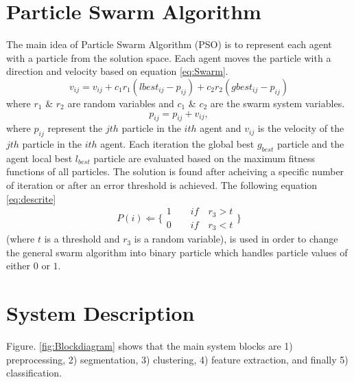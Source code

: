 \documentclass[a4paper,10pt]{IEEEconf}
\begin{document}
\section{Particle Swarm Algorithm}
\label{PSO}
The main idea of  Particle Swarm Algorithm (PSO) is to represent each agent with a particle from the solution space. Each agent moves the particle with a direction and velocity based on equation \ref{eq:Swarm}.
 \begin{equation}
v_{ij}  = v_{ij}  + c_1 r_1 (lbest_{ij}  - p_{ij} ) + c_2 r_2 (gbest_{ij}  - p_{ij} )
\label{eq:Swarm}
\end{equation}
 where $r_1$ \& $r_2$ are random variables and $c_1$ \& $c_2$ are the swarm system variables.
\begin{equation}
p_{ij}=p_{ij}+v_{ij},
\end{equation}
where $p_{ij}$ represent the $jth$ particle in the $ith$ agent and $v_{ij}$ is the velocity of the $jth$ particle in the $ith$ agent. Each iteration the global best $g_{best}$ particle and the agent local best $l_{best}$ particle are evaluated based on the maximum fitness functions of all particles. The solution is found after acheiving a specific number of iteration or after an error threshold is achieved.
The following equation \ref{eq:descrite}  
\begin{equation}
   P(i)\Leftarrow 
\{
\begin{array}{c} 
1 \quad \quad if\quad r_{3}>t  \\

0 \quad \quad if\quad r_{3}<t 
\label{eq:descrite}
\end{array}\}
\end{equation}
 (where $t$ is a threshold and $r_{3}$ is a random variable), is used in order to change the general swarm algorithm into binary particle which handles particle values of either $0$ or $1$. 
    
\section{System Description}
\label{Sysdisc}
Figure. \ref{fig:Blockdiagram} shows that the main system blocks are 1) preprocessing, 2) segmentation, 3) clustering, 4) feature extraction, and finally 5) classification. 
\end{document}
